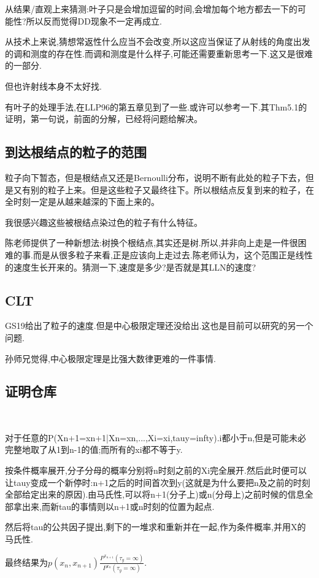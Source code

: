 						从结果/直观上来猜测:叶子只是会增加逗留的时间,会增加每个地方都去一下的可能性?所以反而觉得DD现象不一定再成立.

						从技术上来说,猜想常返性什么应当不会改变,所以这应当保证了从射线的角度出发的调和测度的存在性.而调和测度是什么样子,可能还需要重新思考一下.这又是很难的一部分.

						但也许射线本身不太好找.

						有叶子的处理手法,在LLP96的第五章见到了一些.或许可以参考一下.其Thm5.1的证明，第一句说，前面的分解，已经将问题给解决。


	\subsection{到达根结点的粒子的范围}
		
		粒子向下暂态，但是根结点又还是Bernoulli分布，说明不断有此处的粒子下去，但是又有别的粒子上来。但是这些粒子又最终往下。所以根结点反复到来的粒子，在全时刻一定是从越来越深的下面上来的。

		我很感兴趣这些被根结点染过色的粒子有什么特征。

		陈老师提供了一种新想法:树换个根结点,其实还是树.所以,并非向上走是一件很困难的事.而是从很多粒子来看,正是应该向上走过去.陈老师认为，这个范围正是线性的速度生长开来的。猜测一下,速度是多少?是否就是其LLN的速度?

	\subsection{CLT}

		GS19\cite{GS19}给出了粒子的速度.但是中心极限定理还没给出.这也是目前可以研究的另一个问题.

		孙师兄觉得,中心极限定理是比强大数律更难的一件事情.

	\subsection{证明仓库}

		\begin{pf}[木师姐的证明]
			\label{mu}
			\ 

			对于任意的P(Xn+1=xn+1|Xn=xn,...,Xi=xi,tauy=infty).i都小于n,但是可能未必完整地取了从1到n-1的值;而所有的xi都不等于y.

			按条件概率展开,分子分母的概率分别将n时刻之前的Xi完全展开.然后此时便可以让tauy变成一个新停时:n+1之后的时间首次到y(这就是为什么要把n及之前的时刻全部给定出来的原因).由马氏性,可以将n+1(分子上)或n(分母上)之前时候的信息全部拿出来,而新tau的事情则以n+1或n时刻的位置为起点.

			然后将tau的公共因子提出,剩下的一堆求和重新并在一起,作为条件概率,并用X的马氏性.

			最终结果为$p(x_n,x_{n+1})\displaystyle\frac
			{P^{x_{n+1}}(\tau_y=\infty)}
			{P^{x_{n}}(\tau_y=\infty)}$.

		\end{pf}

